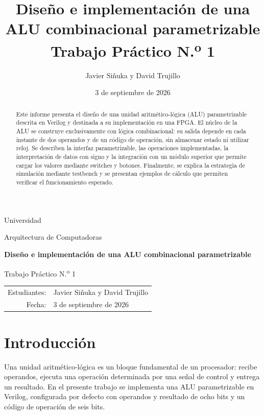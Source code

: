 \documentclass[11pt,a4paper]{article}
\title{\textbf{Diseño e implementación de una ALU combinacional parametrizable}\\[0.4em]
       \large Trabajo Práctico N.\textsuperscript{o} 1}
\author{Javier Siñuka y David Trujillo}
\date{3 de septiembre de 2026}
\begin{document}
\begin{titlepage}
  \hypersetup{pageanchor=false}
  \centering
  \vspace*{1.2cm}
  {\Large Universidad \par}
  \vspace{0.3cm}
  {\large Arquitectura de Computadoras \par}
  \vspace{2.2cm}
  {\LARGE\bfseries Diseño e implementación de una ALU combinacional parametrizable\par}
  \vspace{0.5cm}
  {\large Trabajo Práctico N.\textsuperscript{o} 1\par}
  \vfill
  \begin{tabular}{rl}
    Estudiantes: & Javier Siñuka y David Trujillo \\
    Fecha: & 3 de septiembre de 2026
  \end{tabular}
  \vfill
\end{titlepage}

\hypersetup{pageanchor=true}
\clearpage
{}
\tableofcontents
\clearpage
{}

\begin{abstract}
Este informe presenta el diseño de una unidad aritmético-lógica (ALU)
parametrizable descrita en Verilog y destinada a su implementación en una FPGA. El
núcleo de la ALU se construye exclusivamente con lógica combinacional: su
salida depende en cada instante de dos operandos y de un código de operación,
sin almacenar estado ni utilizar reloj. Se describen la interfaz parametrizable,
las operaciones implementadas, la interpretación de datos con signo y la
integración con un módulo superior que permite cargar los valores mediante
switches y botones. Finalmente, se explica la estrategia de simulación mediante
testbench y se presentan ejemplos de cálculo que permiten verificar el
funcionamiento esperado.
\end{abstract}

\section{Introducción}

Una unidad aritmético-lógica es un bloque fundamental de un procesador: recibe
operandos, ejecuta una operación determinada por una señal de control y entrega
un resultado. En el presente trabajo se implementa una ALU parametrizable en
Verilog, configurada por defecto con operandos y resultado de ocho bits y un
código de operación de seis bits.
\end{document}
